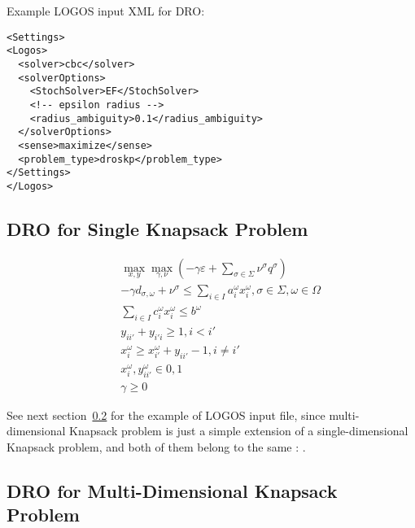 Example LOGOS input XML for DRO:
\begin{lstlisting}[style=XML]
<Settings>
<Logos>
  <solver>cbc</solver>
  <solverOptions>
    <StochSolver>EF</StochSolver>
    <!-- epsilon radius -->
    <radius_ambiguity>0.1</radius_ambiguity>
  </solverOptions>
  <sense>maximize</sense>
  <problem_type>droskp</problem_type>
</Settings>
</Logos>
\end{lstlisting}

\subsection{DRO for Single Knapsack Problem}
\label{subsec:DRO_SKP}

\vst {}
\begin{subequations}\label{DROSimpleKP}
\begin{eqnarray}
& & \max_{x, y} \max_{\gamma, \nu} (-\gamma \varepsilon + \sum_{\sigma \in \Sigma} \nu^\sigma q^\sigma)  \\
& &  -\gamma d_{\sigma, \omega} + \nu^\sigma \le \sum _{i \in I} a_{i}^{ \omega }x_{i}^{ \omega }, \sigma \in \Sigma, \omega \in \Omega \\
& & \sum_{i \in I} c_{i}^\omega x_{i}^\omega \leq b^\omega \\
& & y_{ii'} + y_{i'i} \geq 1, i<i'  \\
& & x_{i}^\omega \geq x_{i'}^\omega + y_{ii'}-1, i\neq i' \\
& & x_{i}^\omega, y_{ii'}^\omega \in {0, 1} \\
& & \gamma \ge 0
\end{eqnarray}
\end{subequations}

See next section~\ref{subsec:DRO_DKP} for the example of LOGOS input file, since multi-dimensional Knapsack problem
is just a simple extension of a single-dimensional Knapsack problem, and both of them belong to the same
: .


\subsection{DRO for Multi-Dimensional Knapsack Problem}
\label{subsec:DRO_DKP}

